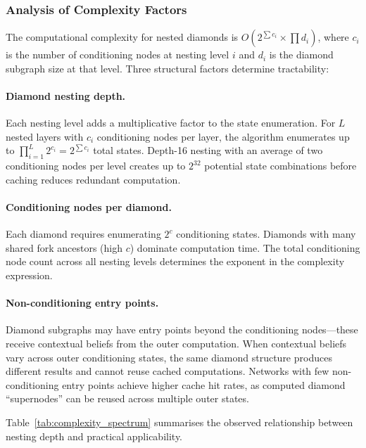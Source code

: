 \subsubsection{Analysis of Complexity Factors}

The computational complexity for nested diamonds is $O(2^{\sum c_i} \times \prod d_i)$, where $c_i$ is the number of conditioning nodes at nesting level $i$ and $d_i$ is the diamond subgraph size at that level. Three structural factors determine tractability:

\paragraph{Diamond nesting depth.} Each nesting level adds a multiplicative factor to the state enumeration. For $L$ nested layers with $c_i$ conditioning nodes per layer, the algorithm enumerates up to $\prod_{i=1}^{L} 2^{c_i} = 2^{\sum c_i}$ total states. Depth-16 nesting with an average of two conditioning nodes per level creates up to $2^{32}$ potential state combinations before caching reduces redundant computation.

\paragraph{Conditioning nodes per diamond.} Each diamond requires enumerating $2^c$ conditioning states. Diamonds with many shared fork ancestors (high $c$) dominate computation time. The total conditioning node count across all nesting levels determines the exponent in the complexity expression.

\paragraph{Non-conditioning entry points.} Diamond subgraphs may have entry points beyond the conditioning nodes---these receive contextual beliefs from the outer computation. When contextual beliefs vary across outer conditioning states, the same diamond structure produces different results and cannot reuse cached computations. Networks with few non-conditioning entry points achieve higher cache hit rates, as computed diamond ``supernodes'' can be reused across multiple outer states.

Table~\ref{tab:complexity_spectrum} summarises the observed relationship between nesting depth and practical applicability.


